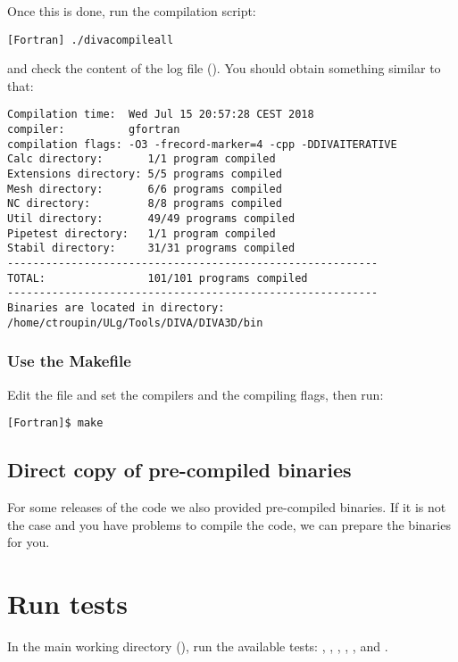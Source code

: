 Once this is done, run the compilation script: 
\begin{lstlisting}[style=Bash]
[Fortran] ./divacompileall
\end{lstlisting}
and check the content of the log file (). You should obtain something similar to that:
\begin{verbatim}
Compilation time:  Wed Jul 15 20:57:28 CEST 2018
compiler:          gfortran
compilation flags: -O3 -frecord-marker=4 -cpp -DDIVAITERATIVE
Calc directory:       1/1 program compiled
Extensions directory: 5/5 programs compiled
Mesh directory:       6/6 programs compiled
NC directory:         8/8 programs compiled
Util directory:       49/49 programs compiled
Pipetest directory:   1/1 program compiled
Stabil directory:     31/31 programs compiled
----------------------------------------------------------
TOTAL:                101/101 programs compiled
----------------------------------------------------------
Binaries are located in directory:
/home/ctroupin/ULg/Tools/DIVA/DIVA3D/bin

\end{verbatim}

\subsubsection{Use the Makefile}

Edit the file  and set the compilers and the compiling flags, then run:

\begin{lstlisting}[style=Bash]
[Fortran]$ make
\end{lstlisting}

\subsection{Direct copy of pre-compiled binaries}

For some releases of the code we also provided pre-compiled binaries. If it is not the case and you have problems to compile the code, we can prepare the binaries for you.

\section{Run tests\label{sec:divatest}}

In the main working directory (), run the available tests: 
, , , , ,  and .



